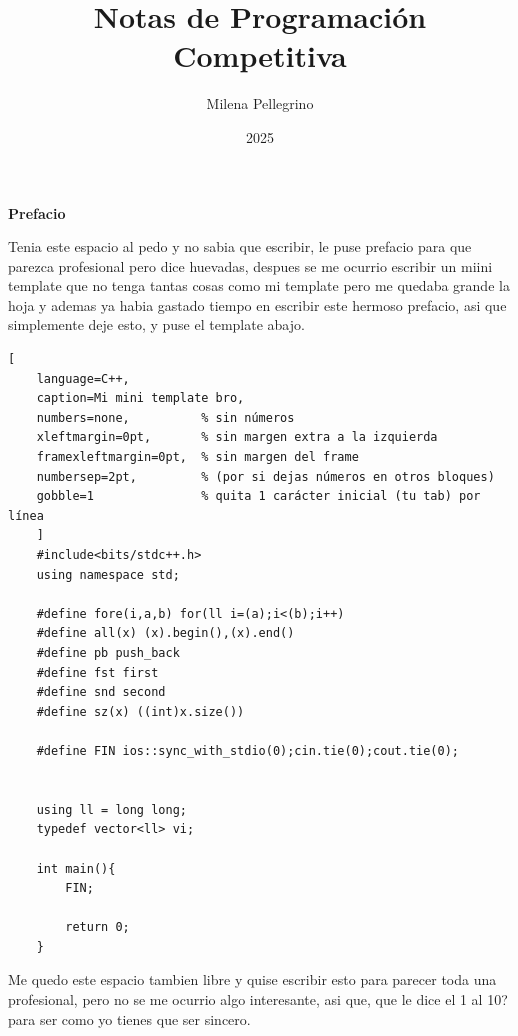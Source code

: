 \documentclass[a4paper,12pt]{book}
\begin{document}
	\author{Milena Pellegrino}
	\title{Notas de  Programación Competitiva}
	\date{2025}
	\frontmatter
	\maketitle
	
	\thispagestyle{empty} %
	\begin{center}
		{\Large \textbf{Prefacio}}
	\end{center}
	
	\vspace{1cm}
	
	Tenia este espacio al pedo y no sabia que escribir, le puse prefacio para que parezca profesional pero dice huevadas, despues se me ocurrio escribir un miini template que no tenga tantas cosas como mi template pero me quedaba grande la hoja y ademas ya habia gastado tiempo en escribir este hermoso prefacio, asi que simplemente deje esto, y puse el template abajo. 
	
	\vspace{1cm}
	
\begin{lstlisting}[
	language=C++,
	caption=Mi mini template bro,
	numbers=none,          % sin números
	xleftmargin=0pt,       % sin margen extra a la izquierda
	framexleftmargin=0pt,  % sin margen del frame
	numbersep=2pt,         % (por si dejas números en otros bloques)
	gobble=1               % quita 1 carácter inicial (tu tab) por línea
	]
	#include<bits/stdc++.h>
	using namespace std;
	
	#define fore(i,a,b) for(ll i=(a);i<(b);i++)
	#define all(x) (x).begin(),(x).end()
	#define pb push_back
	#define fst first
	#define snd second
	#define sz(x) ((int)x.size())
	
	#define FIN ios::sync_with_stdio(0);cin.tie(0);cout.tie(0); 
	
	
	using ll = long long;
	typedef vector<ll> vi;
	
	int main(){
		FIN; 

		return 0;
	}
\end{lstlisting}

	
	\vspace{1cm}
	
	Me quedo  este espacio tambien libre y quise escribir esto para parecer toda una profesional, pero no se me ocurrio algo interesante, asi que, que le dice el 1 al 10? para ser como yo tienes que ser sincero.
	
\end{document}
